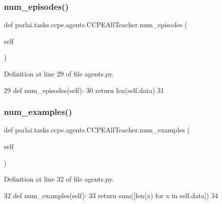 \subsubsection{\texorpdfstring{num\+\_\+episodes()}{num\_episodes()}}
{\footnotesize\ttfamily def parlai.\+tasks.\+ccpe.\+agents.\+C\+C\+P\+E\+All\+Teacher.\+num\+\_\+episodes (\begin{DoxyParamCaption}\item[{}]{self }\end{DoxyParamCaption})}



Definition at line 29 of file agents.\+py.


\begin{DoxyCode}
29     \textcolor{keyword}{def }num\_episodes(self):
30         \textcolor{keywordflow}{return} len(self.data)
31 
\end{DoxyCode}
\mbox{\label{classparlai_1_1tasks_1_1ccpe_1_1agents_1_1CCPEAllTeacher_aa0cd16c6ebf2fa6bc0c8ad2e449445de}} 
\subsubsection{\texorpdfstring{num\+\_\+examples()}{num\_examples()}}
{\footnotesize\ttfamily def parlai.\+tasks.\+ccpe.\+agents.\+C\+C\+P\+E\+All\+Teacher.\+num\+\_\+examples (\begin{DoxyParamCaption}\item[{}]{self }\end{DoxyParamCaption})}



Definition at line 32 of file agents.\+py.


\begin{DoxyCode}
32     \textcolor{keyword}{def }num\_examples(self):
33         \textcolor{keywordflow}{return} sum([len(x) \textcolor{keywordflow}{for} x \textcolor{keywordflow}{in} self.data])
34 
\end{DoxyCode}
\mbox{\label{classparlai_1_1tasks_1_1ccpe_1_1agents_1_1CCPEAllTeacher_ab1b9d65d88c950391175472d72694f80}} 
